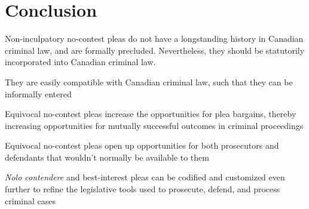 \chapter{Conclusion}

Non-inculpatory no-contest pleas do not have a longstanding history in Canadian criminal law, and are formally precluded. Nevertheless, they should be statutorily incorporated into Canadian criminal law. 

They are easily compatible with Canadian criminal law, such that they can be informally entered

Equivocal no-contest pleas increase the opportunities for plea bargains, thereby increasing opportunities for mutually successful outcomes in criminal proceedings

Equivocal no-contest pleas open up opportunities for both prosecutors and defendants that wouldn't normally be available to them

\textit{Nolo contendere} and best-interest pleas can be codified and customized even further to refine the legislative tools used to prosecute, defend, and process criminal cases
